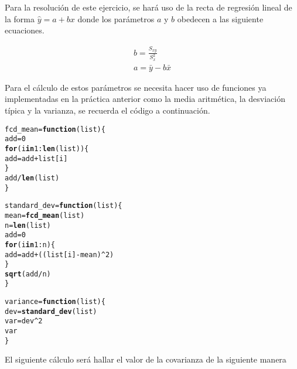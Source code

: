 \documentclass[12pt]{report}\usepackage[]{graphicx}\usepackage[dvipsnames]{xcolor}
\makeatletter
\newcommand{\hlnum}[1]{\textcolor[rgb]{0.686,0.059,0.569}{#1}}%
\newcommand{\hlopt}[1]{\textcolor[rgb]{0,0,0}{#1}}%
\newcommand{\hlstd}[1]{\textcolor[rgb]{0.345,0.345,0.345}{#1}}%
\newcommand{\hlkwa}[1]{\textcolor[rgb]{0.161,0.373,0.58}{\textbf{#1}}}%
\newcommand{\hlkwb}[1]{\textcolor[rgb]{0.69,0.353,0.396}{#1}}%
\newcommand{\hlkwc}[1]{\textcolor[rgb]{0.333,0.667,0.333}{#1}}%
\newcommand{\hlkwd}[1]{\textcolor[rgb]{0.737,0.353,0.396}{\textbf{#1}}}%
\newenvironment{kframe}{%
 \def\at@end@of@kframe{}%
 \ifinner\ifhmode%
  \def\at@end@of@kframe{\end{minipage}}%
  \begin{minipage}{\columnwidth}%
 \fi\fi%
 \def\FrameCommand##1{\hskip\@totalleftmargin \hskip-\fboxsep
 \colorbox{shadecolor}{##1}\hskip-\fboxsep
     \hskip-\linewidth \hskip-\@totalleftmargin \hskip\columnwidth}%
 \MakeFramed {\advance\hsize-\width
   \@totalleftmargin\z@ \linewidth\hsize
   \@setminipage}}%
 {\par\unskip\endMakeFramed%
 \at@end@of@kframe}
\newenvironment{knitrout}{}{} %
\makeatother
\begin{document}
 				Para la resolución de este ejercicio, se hará uso de la recta de regresión lineal de la forma $\hat{y} = a + bx$ donde los parámetros $a$ y $b$ obedecen a las siguiente ecuaciones. 
 				
 				\begin{equation}\label{ec:reg_param}
 					\begin{gathered}
 						b = \frac{S_{xy}}{S^2_x}\\
 						a = \bar{y} - b \bar{x}
 					\end{gathered}
 				\end{equation}
 				
 				Para el cálculo de estos parámetros se necesita hacer uso de funciones ya implementadas en la práctica anterior como la media aritmética, la desviación típica y la varianza, se recuerda el código a continuación. 
 				
\begin{knitrout}
\color{fgcolor}\begin{kframe}
\begin{alltt}
\hlstd{fcd_mean} \hlkwb{=} \hlkwa{function}\hlstd{(}\hlkwc{list}\hlstd{) \{}
        \hlstd{add} \hlkwb{=} \hlnum{0}
        \hlkwa{for} \hlstd{(i} \hlkwa{in} \hlnum{1}\hlopt{:}\hlkwd{len}\hlstd{(list)) \{}
                \hlstd{add} \hlkwb{=} \hlstd{add} \hlopt{+} \hlstd{list[i]}
        \hlstd{\}}
        \hlstd{add} \hlopt{/} \hlkwd{len}\hlstd{(list)}
\hlstd{\}}

\hlstd{standard_dev} \hlkwb{=} \hlkwa{function}\hlstd{(}\hlkwc{list}\hlstd{) \{}
        \hlstd{mean} \hlkwb{=} \hlkwd{fcd_mean}\hlstd{(list)}
        \hlstd{n} \hlkwb{=} \hlkwd{len}\hlstd{(list)}
        \hlstd{add} \hlkwb{=} \hlnum{0}
        \hlkwa{for} \hlstd{(i} \hlkwa{in} \hlnum{1}\hlopt{:}\hlstd{n) \{}
                \hlstd{add} \hlkwb{=} \hlstd{add} \hlopt{+} \hlstd{((list[i]} \hlopt{-} \hlstd{mean)}\hlopt{^}\hlnum{2}\hlstd{)}
        \hlstd{\}}
        \hlkwd{sqrt}\hlstd{(add}\hlopt{/}\hlstd{n)}
\hlstd{\}}

\hlstd{variance} \hlkwb{=} \hlkwa{function}\hlstd{(}\hlkwc{list}\hlstd{) \{}
        \hlstd{dev} \hlkwb{=} \hlkwd{standard_dev}\hlstd{(list)}
        \hlstd{var} \hlkwb{=} \hlstd{dev}\hlopt{^}\hlnum{2}
        \hlstd{var}
\hlstd{\}}
\end{alltt}
\end{kframe}
\end{knitrout}
 				
 				El siguiente cálculo será hallar el valor de la covarianza de la siguiente manera
 				
\end{document}
